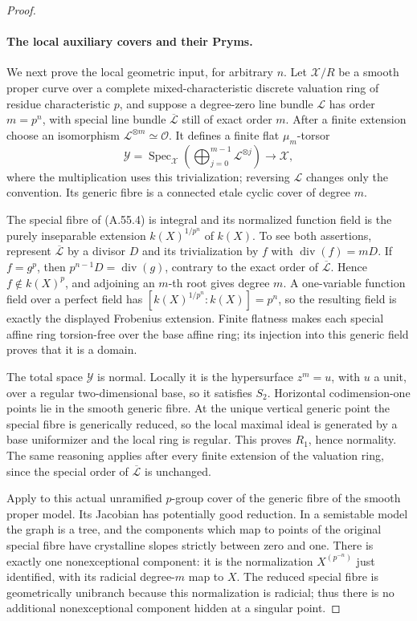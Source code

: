 \begin{proof}
\paragraph{The local auxiliary covers and their Pryms.}
We next prove the local geometric input, for arbitrary \(n\).
Let \(\mathcal X/R\) be a smooth proper curve over a complete
mixed-characteristic discrete valuation ring of residue
characteristic \(p\), and suppose a degree-zero line bundle
\(\mathcal L\) has order \(m=p^n\), with special line bundle
\(\overline{\mathcal L}\) still of exact order \(m\).
After a finite extension choose an isomorphism
\(\mathcal L^{\otimes m}\simeq\mathcal O\). It defines a finite
flat \(\mu_m\)-torsor
\[
 \mathcal Y=\operatorname{Spec}_{\mathcal X}
        \left(\bigoplus_{j=0}^{m-1}\mathcal L^{\otimes j}\right)
                         \longrightarrow\mathcal X,       \tag{A.55.4}
\]
where the multiplication uses this trivialization; reversing
\(\mathcal L\) changes only the convention. Its generic fibre
is a connected etale cyclic cover of degree \(m\).

The special fibre of (A.55.4) is integral and its normalized
function field is the purely inseparable extension
\(k(X)^{1/p^n}\) of \(k(X)\). To see both assertions, represent
\(\overline{\mathcal L}\) by a divisor \(D\) and its trivialization
by \(f\) with \(\operatorname{div}(f)=mD\). If \(f=g^p\),
then \(p^{n-1}D=\operatorname{div}(g)\), contrary to the exact
order of \(\overline{\mathcal L}\). Hence \(f\notin k(X)^p\),
and adjoining an \(m\)-th root gives degree \(m\).
A one-variable function field over a perfect field has
\([k(X)^{1/p^n}:k(X)]=p^n\), so the resulting field is exactly
the displayed Frobenius extension. Finite flatness makes each
special affine ring torsion-free over the base affine ring;
its injection into this generic field proves that it is a domain.

The total space \(\mathcal Y\) is normal. Locally it is the
hypersurface \(z^m=u\), with \(u\) a unit, over a regular
two-dimensional base, so it satisfies \(S_2\). Horizontal
codimension-one points lie in the smooth generic fibre. At the
unique vertical generic point the special fibre is generically
reduced, so the local maximal ideal is generated by a base
uniformizer and the local ring is regular. This proves \(R_1\),
hence normality. The same reasoning applies after every finite
extension of the valuation ring, since the special order of
\(\overline{\mathcal L}\) is unchanged.

Apply \citet[Theorem 1, printed p.179]{fghRaynaud1990Pgroups}
to this actual unramified \(p\)-group cover of the generic fibre
of the smooth proper model. Its Jacobian has potentially good
reduction. In a semistable model the graph is a tree, and the
components which map to points of the original special fibre
have crystalline slopes strictly between zero and one.
There is exactly one nonexceptional component: it is the
normalization \(X^{(p^{-n})}\) just identified, with its radicial
degree-\(m\) map to \(X\). The reduced special fibre is
geometrically unibranch because this normalization is radicial;
thus there is no additional nonexceptional component hidden at
a singular point.


\end{proof}
